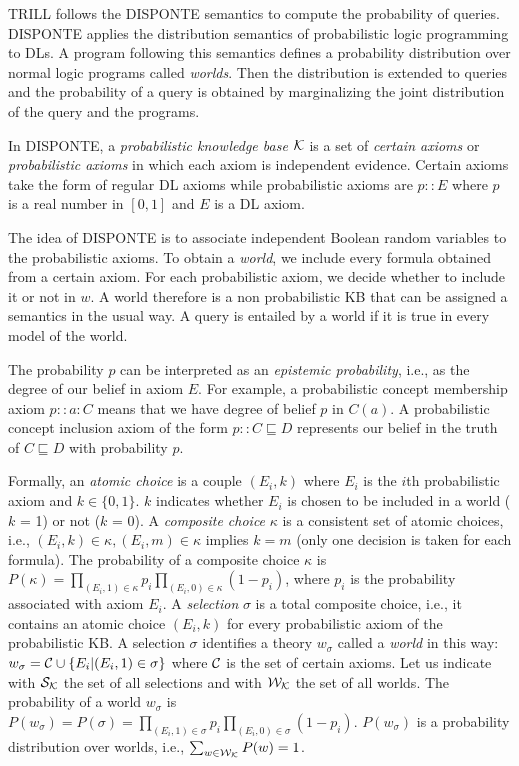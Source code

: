 TRILL follows the DISPONTE \cite{RigBelLamZese12-URSW12,Zese17-SSW-BK} semantics to compute the probability of queries.
DISPONTE applies the distribution semantics \cite{DBLP:conf/iclp/Sato95} of probabilistic logic programming to DLs. 
A program following this semantics defines a probability distribution over normal logic programs
called \emph{worlds}. Then the distribution is extended to queries and the probability of a query is obtained by marginalizing the joint distribution of the query and the programs.

In DISPONTE, a \emph{probabilistic knowledge base} ${\cal K}$ is a set of \emph{certain axioms} or \emph{probabilistic axioms} in which each axiom is independent evidence.
Certain axioms take the form of regular DL axioms while probabilistic axioms are
$p::E$
where $p$ is a real number in $[0,1]$ and $E$ is a DL axiom. 

The idea of DISPONTE is to associate independent Boolean random variables to the probabilistic axioms. 
To obtain a \emph{world}, we include every formula obtained from a certain axiom. 
For each probabilistic axiom, we decide whether to include it or not in $w$.
A world therefore is a non probabilistic KB that can be assigned a semantics in the usual way.
A query is entailed by a world if it is true in every  model of the world.

The probability $p$ can be interpreted as an \emph{epistemic probability}, i.e., as the degree of our belief in axiom $E$. 
For example, a probabilistic concept membership axiom
$
p::a:C
$
means that we have degree of belief $p$ in $C(a)$.
A probabilistic concept inclusion axiom of the form
$
p::C\sqsubseteq D
$
represents our belief in the truth of $C \sqsubseteq D$ with probability $p$. 

Formally, an \emph{atomic choice} is a couple $(E_i,k)$ where $E_i$ is the $i$th probabilistic axiom  and $k\in \{0,1\}$. 
$k$ indicates whether $E_i$ is chosen to be included in a world ($k$ = 1) or not ($k$ = 0). 
A \emph{composite choice} $\kappa$ is a consistent set of atomic choices, i.e.,  $(E_i,k)\in\kappa, (E_i,m)\in \kappa$ implies $k=m$ (only one decision is taken for each formula). 
The probability of a composite choice $\kappa$  is 
$P(\kappa)=\prod_{(E_i,1)\in \kappa}p_i\prod_{(E_i, 0)\in \kappa} (1-p_i)$, where $p_i$ is the probability associated with axiom $E_i$.
A \emph{selection} $\sigma$ is a total composite choice, i.e., it contains an atomic choice $(E_i,k)$ for every 
probabilistic axiom  of the probabilistic KB. 
A selection $\sigma$ identifies a theory $w_\sigma$ called  a \emph{world} in this way:
$w_\sigma={\cal C}\cup\{E_i|(E_i,1)\in \sigma\}$ where ${\cal C}$ is the set of certain axioms. Let us indicate with $\mathcal{S}_{\cal K}$ the set of all selections and with $\mathcal{W}_{\cal K}$ the set of all worlds.
The probability of a world $w_\sigma$  is 
$P(w_\sigma)=P(\sigma)=\prod_{(E_i,1)\in \sigma}p_i\prod_{(E_i, 0)\in \sigma} (1-p_i)$.
$P(w_\sigma)$ is a probability distribution over worlds, i.e., $\sum_{w\in \mathcal{W}_{\cal K}}P(w)=1$.

